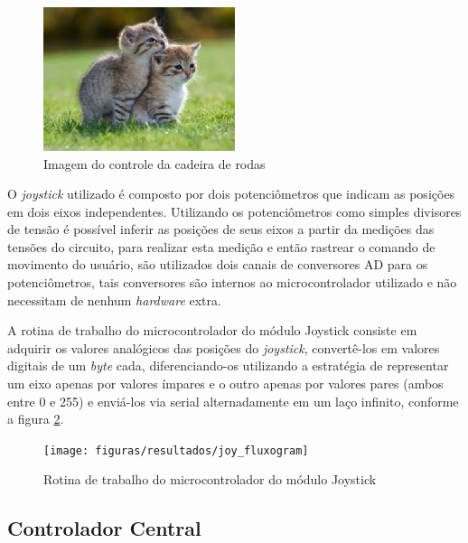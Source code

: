 \begin{figure}[!htb]
\centering
\includegraphics[width = 0.5\textwidth]{figuras/resultados/joy_hand_control}
\caption{Imagem do controle da cadeira de rodas}
\label{fig:joy_hand_control}
\end{figure}

O \textit{joystick} utilizado é composto por dois potenciômetros que indicam as posições em dois eixos independentes. Utilizando os potenciômetros como simples divisores de tensão é possível inferir as posições de seus eixos a partir da medições das tensões do circuito, para realizar esta medição e então rastrear o comando de movimento do usuário, são utilizados dois canais de conversores AD para os potenciômetros, tais conversores são internos ao microcontrolador utilizado e não necessitam de nenhum \textit{hardware} extra.

A rotina de trabalho do microcontrolador do módulo Joystick consiste em adquirir os valores analógicos das posições do \textit{joystick}, convertê-los em valores digitais de um \textit{byte} cada, diferenciando-os utilizando a estratégia de representar um eixo apenas por valores ímpares e o outro apenas por valores pares (ambos entre 0 e 255) e enviá-los via serial alternadamente em um laço infinito, conforme a figura \ref{fig:joy_fluxogram}.

\begin{figure}[!htb]
\centering
\texttt{[image: figuras/resultados/joy\_fluxogram]}
\caption{Rotina de trabalho do microcontrolador do módulo Joystick}
\label{fig:joy_fluxogram}
\end{figure}

\subsection{Controlador Central}


